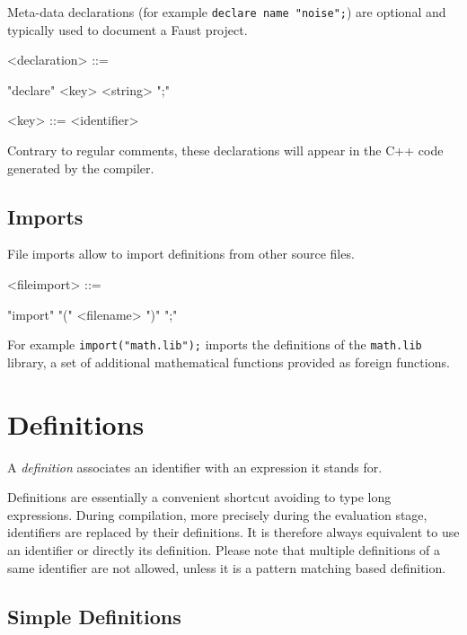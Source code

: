 \documentclass[a4paper]{book}
\begin{document}
Meta-data declarations (for example \lstinline'declare name "noise";') are optional and typically used to document a Faust project. 

\begin{grammar}
  <declaration> ::= 
  \begin{syntdiag}
    "declare" <key> <string> ";"
  \end{syntdiag}
\end{grammar}

\begin{grammar}
  <key> ::= 
    <identifier>
\end{grammar}

Contrary to regular comments, these declarations will appear in the C++ code generated by the compiler.


\subsection{Imports}

File imports allow to import definitions from other source files.  

\begin{grammar}
  <fileimport> ::= 
  \begin{syntdiag}
    "import"  "(" <filename> ")" ";"
  \end{syntdiag}
\end{grammar}

For example \lstinline{import("math.lib");} imports the definitions of the \lstinline{math.lib} library, a set of additional mathematical functions provided as foreign functions.


\section{Definitions}

A \textit{definition} associates an identifier with an expression it stands for. 

Definitions are essentially a convenient shortcut avoiding to type long expressions. During compilation, more precisely during the evaluation stage, identifiers are replaced by their definitions. It is therefore always equivalent to use an identifier or directly its definition. Please note that multiple definitions of a same identifier are not allowed, unless it is a pattern matching based definition.

\subsection{Simple Definitions}
\end{document}
